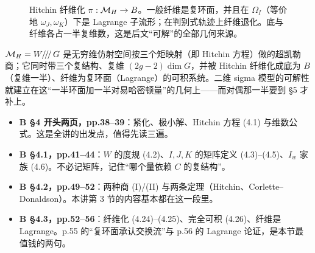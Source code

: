 \begin{figure}[htbp]
\centering
{}
\caption{Hitchin 纤维化 $\pi:\mathcal{M}_{H}\to B$。一般纤维是复环面，并且在 $\Omega_I$（等价地 $\omega_J,\omega_K$）下是 Lagrange 子流形；在判别式轨迹上纤维退化。底与纤维各占一半复维数，这是后文“可解”的全部几何来源。}
\label{fig:fibration}
\end{figure}

\begin{keybox}
$\mathcal{M}_{H}=W/\!/\!/\,G$ 是无穷维仿射空间按三个矩映射（即 Hitchin 方程）做的超凯勒商；它同时带三个复结构、复维 $(2g-2)\dim G$，并被 Hitchin 纤维化成底为 $B$（复维一半）、纤维为复环面（Lagrange）的可积系统。二维 sigma 模型的可解性就建立在这“一半环面加一半对易哈密顿量”的几何上——而对偶那一半要到 §5 才补上。
\end{keybox}

\begin{follow}
\begin{itemize}
\item \textbf{B §4 开头两页，pp.38--39}：紧化、极小解、Hitchin 方程 (4.1) 与维数公式。这是全讲的出发点，值得先读三遍。
\item \textbf{B §4.1，pp.41--44}：$W$ 的度规 (4.2)、$I,J,K$ 的矩阵定义 (4.3)--(4.5)、$I_w$ 家族 (4.6)。不必记矩阵，记住“哪个量依赖 $C$ 的复结构”。
\item \textbf{B §4.2，pp.49--52}：两种商 (I)/(II) 与两条定理（Hitchin、Corlette--Donaldson）。本讲第 3 节的内容基本都在这一段里。
\item \textbf{B §4.3，pp.52--56}：纤维化 (4.24)--(4.25)、完全可积 (4.26)、纤维是 Lagrange。p.55 的“复环面承认交换流”与 p.56 的 Lagrange 论证，是本节最值钱的两句。
\end{itemize}
\end{follow}

